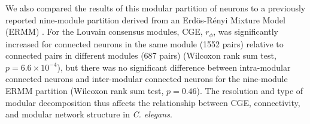 \documentclass[10pt,letterpaper]{article}
\begin{document}
{We also compared the results of this modular partition of neurons to a previously reported nine-module partition derived from an Erd\"os-R\'enyi Mixture Model (ERMM) \cite{Pavlovic:2014gx}.
For the Louvain consensus modules, CGE, $r_\phi$, was significantly increased for connected neurons in the same module (1552 pairs) relative to connected pairs in different modules (687 pairs) (Wilcoxon rank sum test, $p = 6.6 \times 10^{-4}$), but there was no significant difference between intra-modular connected neurons and inter-modular connected neurons for the nine-module ERMM partition (Wilcoxon rank sum test, $p = 0.46$).
The resolution and type of modular decomposition thus affects the relationship between CGE, connectivity, and modular network structure in \emph{C. elegans}.
}
\end{document}
